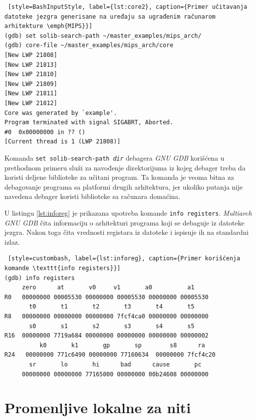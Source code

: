 \documentclass[12pt,oneside]{memoir}
\begin{document}
\begin{lstlisting} [style=BashInputStyle, label={lst:core2}, caption={Primer učitavanja datoteke jezgra generisane na uređaju sa ugrađenim računarom arhitekture \emph{MIPS}}]
(gdb) set solib-search-path ~/master_examples/mips_arch/
(gdb) core-file ~/master_examples/mips_arch/core
[New LWP 21808]
[New LWP 21813]
[New LWP 21810]
[New LWP 21809]
[New LWP 21811]
[New LWP 21812]
Core was generated by `example'.
Program terminated with signal SIGABRT, Aborted.
#0  0x00000000 in ?? ()
[Current thread is 1 (LWP 21808)]
\end{lstlisting}

Komanda \texttt{set solib-search-path \emph{dir}} debagera \emph{GNU GDB} korišćena u prethodnom primeru služi za navođenje direktorijuma iz kojeg debager treba da koristi deljene biblioteke za učitani program. Ta komanda je veoma bitna za debagovanje programa sa platformi drugih arhitektura, jer ukoliko putanja nije navedena debager koristi biblioteke sa računara domaćina.

U listingu \ref{lst:inforeg} je prikazana upotreba komande \texttt{info registers}. \emph{Multiarch GNU GDB} čita informaciju o arhitekturi programa koji se debaguje iz datoteke jezgra. Nakon toga čita vrednosti registara iz datoteke i ispisuje ih na standardni izlaz.

\begin{lstlisting} [style=custombash, label={lst:inforeg}, caption={Primer korišćenja komande \texttt{info registers}}]
(gdb) info registers 
	 zero      at       v0     v1       a0	        a1       
R0   00000000 00005530 00000000 00005530 00000000 00005530
       t0       t1       t2       t3       t4       t5       
R8   00000000 00000000 00000000 7fcf4ca0 00000000 00000000
       s0       s1       s2       s3       s4       s5       
R16  00000000 7719a684 00000000 00000000 00000000 00000002
          k0       k1       gp       sp        s8      ra
R24   00000000 771c6490 00000000 77160634  00000000 7fcf4c20
       sr       lo       hi      bad      cause       pc
     00000000 00000000 77165000 00000000 00b24608 00000000
\end{lstlisting}

\chapter{Promenljive lokalne za niti}
\label{chp:TLS}
\end{document}
